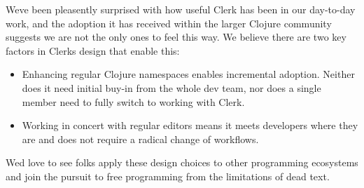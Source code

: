 \documentclass[sigconf,screen,pbalance=true]{acmart}
\providecommand{\tightlist}{%
  \setlength{\itemsep}{0pt}\setlength{\parskip}{0pt}}
\begin{document}
We\textquotesingle ve been pleasently surprised with how useful Clerk has been in our day-to-day work, and the adoption it has received within the larger Clojure community suggests we are not the only ones to feel this way. We believe there are two key factors in Clerk\textquotesingle s design that enable this:

\begin{itemize}
\tightlist
\item
  Enhancing regular Clojure namespaces enables incremental adoption. Neither does it need initial buy-in from the whole dev team, nor does a single member need to fully switch to working with Clerk.
\item
  Working in concert with regular editors means it meets developers where they are and does not require a radical change of workflows.
\end{itemize}

We\textquotesingle d love to see folks apply these design choices to other programming ecosystems and join the pursuit to free programming from the limitations of dead text.

%
%
%
%
\end{document}
